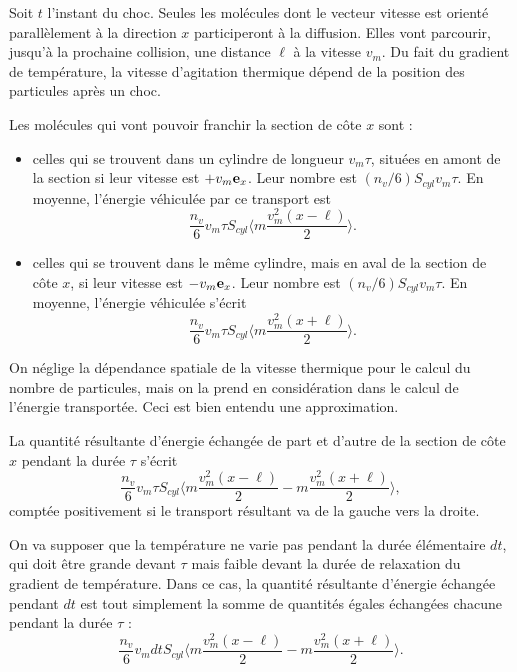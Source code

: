 \documentclass[11pt,a4paper]{report}
\begin{document}
Soit $t$ l'instant du choc. Seules les molécules dont le vecteur vitesse est orienté parallèlement à la direction $x$ participeront à la diffusion. Elles vont parcourir, jusqu'à la prochaine collision, une distance $\ell$ à la vitesse $v_m$. Du fait du gradient de température, la vitesse d'agitation thermique dépend de la position des particules après un choc.

Les molécules qui vont pouvoir franchir la section de côte $x$ sont :
\begin{itemize}
\item celles qui se trouvent dans un cylindre de longueur $v_m \tau$, situées en amont de la section si leur vitesse est $+v_m \bold{e}_x$. Leur nombre est $(n_v/6) S_{cyl}v_m\tau$. En moyenne, l'énergie véhiculée par ce transport est
\begin{equation}
	\frac{n_v}{6} v_m \tau S_{cyl} \Bigg\langle m \frac{v_m^2(x-\ell)}{2} \Bigg\rangle.
\end{equation}

\item celles qui se trouvent dans le même cylindre, mais en aval de la section de côte $x$, si  leur vitesse est $-v_m \bold{e}_x$. Leur nombre est $(n_v/6) S_{cyl}v_m\tau$. En moyenne, l'énergie véhiculée s'écrit
\begin{equation}
	\frac{n_v}{6} v_m \tau S_{cyl} \Bigg\langle m \frac{v_m^2(x+\ell)}{2} \Bigg\rangle.
\end{equation}
\end{itemize}

On néglige la dépendance spatiale de la vitesse thermique pour le calcul du nombre de particules, mais on la prend en considération dans le calcul de l'énergie transportée. Ceci est bien entendu une approximation.

La quantité résultante d'énergie échangée de part et d'autre de la section de côte $x$ pendant la durée $\tau$ s'écrit
\begin{equation}
	\frac{n_v}{6}v_m \tau S_{cyl} \Bigg\langle m \frac{v_m^2(x-\ell)}{2} - m \frac{v_m^2(x+\ell)}{2} \Bigg\rangle,
\end{equation}
comptée positivement si le transport résultant va de la gauche vers la droite.
 
On va supposer que la température ne varie pas pendant la durée élémentaire $dt$, qui doit être grande devant $\tau$ mais faible devant la durée de relaxation du gradient de température. Dans ce cas, la quantité résultante d'énergie échangée pendant $dt$ est tout simplement la somme de quantités égales échangées chacune pendant la durée $\tau$ :
\begin{equation}
	\frac{n_v}{6}v_m dt S_{cyl} \Bigg\langle m \frac{v_m^2(x-\ell)}{2} - m \frac{v_m^2(x+\ell)}{2} \Bigg\rangle.
\end{equation}
\end{document}
